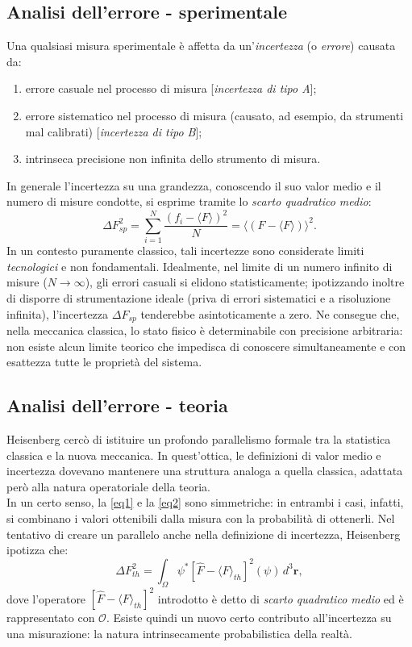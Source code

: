 \documentclass[a4paper,11pt]{report}
\begin{document}
\subsection{Analisi dell'errore - sperimentale}
Una qualsiasi misura sperimentale è affetta da un'\textit{incertezza} (o \textit{errore}) causata da:
\begin{enumerate}
\item errore casuale nel processo di misura [\textit{incertezza di tipo A}];
\item errore sistematico nel processo di misura (causato, ad esempio, da strumenti mal calibrati) [\textit{incertezza di tipo B}];
\item intrinseca precisione non infinita dello strumento di misura.
\end{enumerate}
In generale l'incertezza su una grandezza, conoscendo il suo valor medio e il numero di misure condotte, si esprime tramite lo \textit{scarto quadratico medio}:
\begin{equation}
     \Delta F_{sp}^2 = \sum_{i = 1}^N  \frac{(f_i-\langle F \rangle)^2}{N} = \langle (F - \langle F \rangle) \rangle ^2.
\end{equation}
In un contesto puramente classico, tali incertezze sono considerate limiti \textit{tecnologici} e non fondamentali. Idealmente, nel limite di un numero infinito di misure ($N \to \infty$), gli errori casuali si elidono statisticamente; ipotizzando inoltre di disporre di strumentazione ideale (priva di errori sistematici e a risoluzione infinita), l'incertezza $\Delta F_{sp}$ tenderebbe asintoticamente a zero.
Ne consegue che, nella meccanica classica, lo stato fisico è determinabile con precisione arbitraria: non esiste alcun limite teorico che impedisca di conoscere simultaneamente e con esattezza tutte le proprietà del sistema.

\subsection{Analisi dell'errore - teoria}
Heisenberg cercò di istituire un profondo parallelismo formale tra la statistica classica e la nuova meccanica. In quest'ottica, le definizioni di valor medio e incertezza dovevano mantenere una struttura analoga a quella classica, adattata però alla natura operatoriale della teoria. \\

\noindent
In un certo senso, la \eqref{eq1} e la \eqref{eq2} sono simmetriche: in entrambi i casi, infatti, si combinano i valori ottenibili dalla misura con la probabilità di ottenerli. Nel tentativo di creare un parallelo anche nella definizione di incertezza, Heisenberg ipotizza che:
\begin{equation}
     \Delta F_{th}^2 = \int_\Omega \psi^* [\hat{F}-\langle F \rangle_{th}]^2(\psi) \, d^3\bm{r},
\end{equation}
dove l'operatore $[\hat{F}-\langle F \rangle_{th}]^2$ introdotto è detto di \textit{scarto quadratico medio} ed è rappresentato con $\hat{\mathcal{O}}$. Esiste quindi un nuovo certo contributo all'incertezza su una misurazione: la natura intrinsecamente probabilistica della realtà. 
\end{document}
